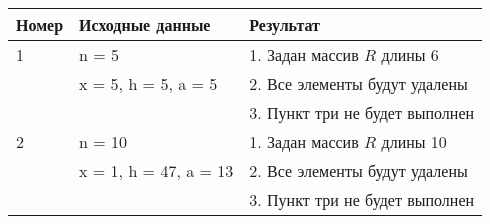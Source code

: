 \begin{table}[h]
    \centering
    \begin{tabular}{|l|l|l|}
        \hline
        Номер & Исходные данные & Результат\\[2ex]
        \hline
        1 & n = 5 & 1. Задан массив \(R\) длины 6 \\
          & x = 5, h = 5, a = 5 & 2. Все элементы будут удалены\\
          & & 3. Пункт три не будет выполнен\\
        \hline
        2 & n = 10 & 1. Задан массив \(R\) длины 10 \\
          & x = 1, h = 47, a = 13 & 2. Все элементы будут удалены\\
          & & 3. Пункт три не будет выполнен\\ 
        \hline
    \end{tabular}
\end{table}